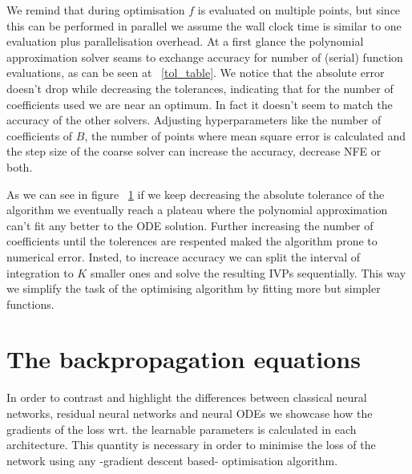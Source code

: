 \documentclass{article}
\begin{document}
    We remind that during optimisation $f$ is evaluated on multiple points, but since this can be performed in parallel
    we assume the wall clock time is similar to one evaluation plus parallelisation overhead.
    At a first glance the polynomial approximation solver seams to exchange accuracy for number of (serial) function
    evaluations, as can be seen at ~\ref{tol_table}.
    We notice that the absolute error doesn't drop while decreasing the tolerances, indicating that for the number of
    coefficients used we are near an optimum.
    In fact it doesn't seem to match the accuracy of the other solvers.
    Adjusting hyperparameters like the number of coefficients of $B$, the number of points where mean square error is
    calculated and the step size of the coarse solver can increase the accuracy, decrease NFE or both.

    \begin{figure}[h]
        \begin{center}
            
        \end{center}
        \label{fig:plateau}
    \end{figure}

    As we can see in figure ~\ref{fig:plateau} if we keep decreasing the absolute tolerance of the algorithm we
    eventually reach a plateau where the polynomial approximation can't fit any better to the ODE solution.
    Further increasing the number of coefficients until the tolerences are respented maked the algorithm prone to
    numerical error.
    Insted, to increace accuracy we can split the interval of integration to $K$ smaller ones and solve the resulting
    IVPs sequentially.
    This way we simplify the task of the optimising algorithm by fitting more but simpler functions.



    \printbibliography

    \appendix


    \section{The backpropagation equations}
    In order to contrast and highlight the differences between classical neural networks, residual neural networks and neural ODEs we showcase how the gradients of the loss wrt.
    the learnable parameters is calculated in each architecture.
    This quantity is necessary in order to minimise the loss of the network using any -gradient descent based- optimisation algorithm.
\end{document}
